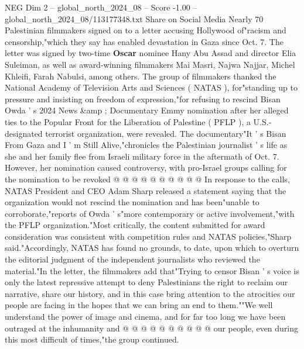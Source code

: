 \begin{textsample}{NEG Dim 2 – global\_north\_2024\_08 – Score -1.00 – global\_north\_2024\_08/113177348.txt}  \label{ex:f2_neg_354}
Share on Social Media Nearly 70 Palestinian filmmakers signed on to a letter accusing Hollywood of"racism and censorship,"which they say has enabled devastation in Gaza since Oct. 7.
The letter was signed by two-time \textbf{Oscar} nominee Hany Abu Assad and director Elia Suleiman, as well as award-winning filmmakers Mai Masri, Najwa Najjar, Michel Khleifi, Farah Nabulsi, among others.
The group of filmmakers thanked the National Academy of Television Arts and Sciences ( NATAS ), for"standing up to pressure and insisting on freedom of expression,"for refusing to rescind Bisan Owda ' s 2024 News \&amp ; Documentary Emmy nomination after her alleged ties to the Popular Front for the Liberation of Palestine ( PFLP ), a U.S.-designated terrorist organization, were revealed.
The documentary"It ' s Bisan From Gaza and I ' m Still Alive,"chronicles the Palestinian journalist ' s life as she and her family flee from Israeli military force in the aftermath of Oct. 7.
However, her nomination caused controversy, with pro-Israel groups calling for the nomination to be revoked @ @ @ @ @ @ @ @ @ @ In response to the calls, NATAS President and CEO Adam Sharp released a statement saying that the organization would not rescind the nomination and has been"unable to corroborate,"reports of Owda ' s"more contemporary or active involvement,"with the PFLP organization."Most critically, the content submitted for award consideration was consistent with competition rules and NATAS policies,"Sharp said."Accordingly, NATAS has found no grounds, to date, upon which to overturn the editorial judgment of the independent journalists who reviewed the material."In the letter, the filmmakers add that"Trying to censor Bisan ' s voice is only the latest repressive attempt to deny Palestinians the right to reclaim our narrative, share our history, and in this case bring attention to the atrocities our people are facing in the hopes that we can bring an end to them.""We well understand the power of image and cinema, and for far too long we have been outraged at the inhumanity and @ @ @ @ @ @ @ @ @ @ our people, even during this most difficult of times,"the group continued.

\end{textsample}
